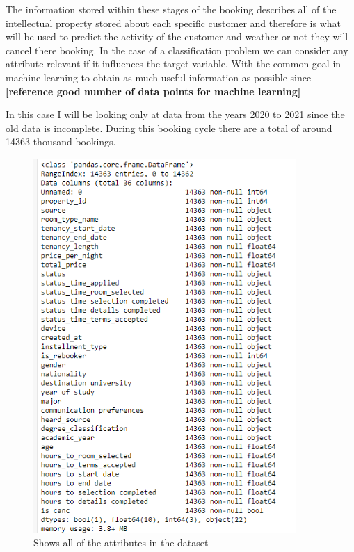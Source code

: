 \vspace{5mm}

The information stored within these stages of the booking describes all of the intellectual property stored about each specific customer and therefore is what will be used to predict the activity of the customer and weather or not they will cancel there booking. In the case of a classification problem we can consider any attribute relevant if it influences the target variable. With the common goal in machine learning to obtain as much useful information as possible since \textbf{[reference good number of data points for machine learning]}

In this case I will be looking only at data from the years 2020 to 2021 since the old data is incomplete. During this booking cycle there are a total of around 14363 thousand bookings.

\begin{figure}[hbt!]
 \includegraphics[width=10cm]{figures/df_info.png}
 \caption{Shows all of the attributes in the dataset}
\end{figure}


